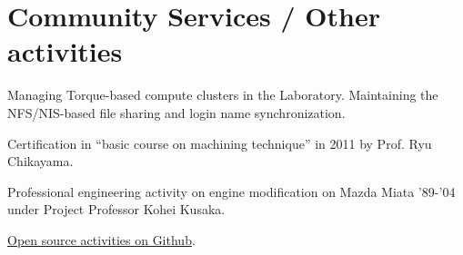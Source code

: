 \documentclass[letterpaper]{article}
\begin{document}
\section{Community Services / Other activities}

Managing Torque-based compute clusters in the Laboratory. Maintaining
the NFS/NIS-based file sharing and login name synchronization.

Certification in ``basic course on machining technique'' in 2011 by Prof. Ryu Chikayama.

Professional engineering activity on engine modification
on Mazda Miata '89-'04 under Project Professor Kohei Kusaka.

\href{https://github.com/guicho271828}{Open source activities on Github}.
\end{document}
